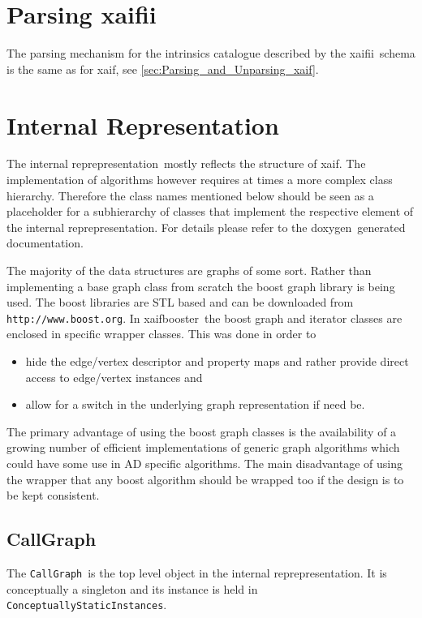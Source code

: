 \documentclass{book}
\newcommand{\doxygen}{doxygen}
\newcommand{\InternalRep}{internal reprepresentation}
\newcommand{\xaif}{xaif}
\newcommand{\xaifbooster}{xaifbooster}
\newcommand{\xaifii}{xaifii}
\newcommand{\CallGraph}{{\tt CallGraph}}
\newcommand{\ConceptuallyStaticInstances}{{\tt ConceptuallyStaticInstances}}
\begin{document}
\section{Parsing \xaifii}
\label{sec:Parsing_xaifii}
The parsing mechanism for the intrinsics catalogue described by the 
\xaifii\ schema is the same as for \xaif, see \ref{sec:Parsing_and_Unparsing_xaif}. 

\section{Internal Representation}
\label{sec:Internal_Representation}
The \InternalRep\ mostly reflects the structure of \xaif. 
The implementation of algorithms 
however requires at times a more complex class hierarchy. 
Therefore the class names mentioned below should be seen 
as a placeholder for a subhierarchy of classes that implement the 
respective element of the \InternalRep.
For details  please refer to the \doxygen\ 
generated documentation. 

The majority of the data structures are graphs of some sort. 
Rather than implementing a base graph class 
from scratch the boost graph library is being used. 
The boost libraries are STL based and 
can be downloaded from {\tt http://www.boost.org}. 
In \xaifbooster\ the boost graph and iterator classes are 
enclosed in specific wrapper classes. This was done in order to 
\begin{itemize}
\item hide the edge/vertex descriptor and property maps and rather 
provide direct access to edge/vertex instances and
\item allow for a switch in the underlying graph representation if need be.
\end{itemize}
The primary advantage of using the boost graph classes is the availability 
of a growing number of 
efficient implementations of generic graph algorithms which could have 
some use in AD specific algorithms. 
The main disadvantage of using the wrapper that 
any boost algorithm should be wrapped too if the design is to be 
kept consistent. 

\subsection{CallGraph} 
\label{ssec:CallGraph}
The \CallGraph\ is the top level object in the \InternalRep. 
It is conceptually a 
singleton \cite{DesignPatterns}  and its instance is 
held in \ConceptuallyStaticInstances. 
\end{document}
